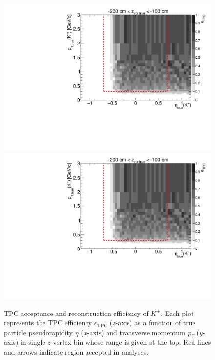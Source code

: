 \begin{figure}[hb]
\caption[TPC acceptance and reconstruction efficiency of $K^{+}$.]{TPC acceptance and reconstruction efficiency of $K^{+}$. Each plot represents the TPC efficiency $\epsilon_{\text{TPC}}$ ($z$-axis) as a function of true particle pseudorapidity $\eta$ ($x$-axis) and transverse momentum $p_{T}$ ($y$-axis) in single $z$-vertex bin whose range is given at the top. Red lines and arrows indicate region accepted in analyses.}\label{fig:tpcEff_kaon_plus}
\centering
\parbox{0.495\textwidth}{
  \centering
  \includegraphics[width=\linewidth,page=3]{graphics/eff/Eff2D_TPC_kaon_Plus.pdf}\\
  \includegraphics[width=\linewidth,page=5]{graphics/eff/Eff2D_TPC_kaon_Plus.pdf}\\
}
\end{figure}
